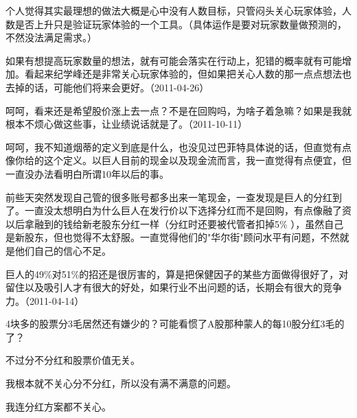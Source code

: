 个人觉得其实最理想的做法大概是心中没有人数目标，只管闷头关心玩家体验，人数是否上升只是验证玩家体验的一个工具。（具体运作是要对玩家数量做预测的，不然没法满足需求。）

如果有想提高玩家数量的想法，就有可能会落实在行动上，犯错的概率就有可能增加。看起来纪学峰还是非常关心玩家体验的，但如果把关心人数的那一点点想法也去掉的话，可能他们将来会更好。（2011-04-26）


呵呵，看来还是希望股价涨上去一点？不是在回购吗，为啥子着急嘛？如果是我就根本不烦心做这些事，让业绩说话就是了。（2011-10-11）


呵呵，我不知道烟蒂的定义到底是什么，也没见过巴菲特具体说的话，但直觉有点像你给的这个定义。以巨人目前的现金以及现金流而言，我一直觉得有点便宜，但一直没办法看明白所谓10年以后的事。

前些天突然发现自己管的很多账号都多出来一笔现金，一查发现是巨人的分红到了。一直没太想明白为什么巨人在发行价以下选择分红而不是回购，有点像融了资以后拿融到的钱给新老股东分红一样（分红时还要被代管者扣掉5\% ），虽然自己是新股东，但也觉得不太舒服。一直觉得他们的"华尔街"顾问水平有问题，不然就是他们自己的信心不足。

巨人的49\%对51\%的招还是很厉害的，算是把保健因子的某些方面做得很好了，对留住以及吸引人才有很大的好处，如果行业不出问题的话，长期会有很大的竞争力。（2011-04-14）



4块多的股票分3毛居然还有嫌少的？可能看惯了A股那种蒙人的每10股分红3毛的了？


不过分不分红和股票价值无关。


我根本就不关心分不分红，所以没有满不满意的问题。


我连分红方案都不关心。



